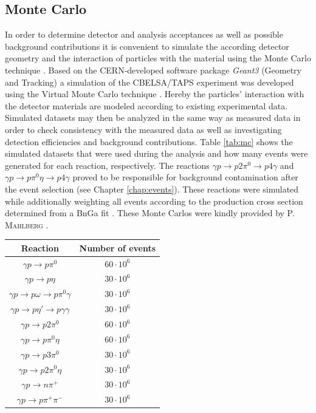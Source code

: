 \subsection{Monte Carlo}
In order to determine detector and analysis acceptances as well as possible background contributions it is convenient to simulate the according detector geometry and the interaction of particles with the material using the Monte Carlo technique \cite{mc}. Based on the CERN-developed software package \emph{Geant3} (Geometry and Tracking) \cite{g3} a simulation of the CBELSA/TAPS experiment was developed using the Virtual Monte Carlo technique \cite{kalisch}. Hereby the particles' interaction with the detector materials are modeled according to existing experimental data. Simulated datasets may then be analyzed in the same way as measured data in order to check consistency with the measured data as well as investigating detection efficiencies and background contributions. Table \ref{tab:mc} shows the simulated datasets that were used during the analysis and how many events were generated for each reaction, respectively. The reactions $\gamma p\to p2\pi^0\to p4\gamma$ and $\gamma p\to p\pi^0\eta\to p4\gamma$ proved to be responsible for background contamination after the event selection (see Chapter \ref{chap:events}). These reactions were simulated while additionally weighting all events according to the production cross section determined from a BnGa fit \cite{bnga1,bnga2}.  These Monte Carlos were kindly provided by \textsc{P. Mahlberg} \cite{mahlbergphd}.
\begin{table}[htbp]
	\centering
	\begin{tabular}{cc}
		\toprule
		Reaction & Number of events\\
		\hline
		$\gamma p \to p\pi^0$ & $60\cdot10^6$\\
		$\gamma p \to p\eta$ & $30\cdot10^6$\\
		$\gamma p \to p\omega\to p\pi^0\gamma$ & $30\cdot10^6$\\
		$\gamma p \to p\eta'\to p\gamma\gamma$ & $30\cdot10^6$\\
		$\gamma p \to p2\pi^0$ & $60\cdot10^6$\\
		$\gamma p \to p\pi^0\eta$ & $60\cdot10^6$\\
		$\gamma p \to p3\pi^0$ & $30\cdot10^6$\\
		$\gamma p \to p2\pi^0\eta$ & $30\cdot10^6$\\
		$\gamma p \to n\pi^+$ & $30\cdot10^6$\\
		$\gamma p \to p\pi^+\pi^-$ & $30\cdot10^6$\\
		\bottomrule
	\end{tabular}
\end{table}

